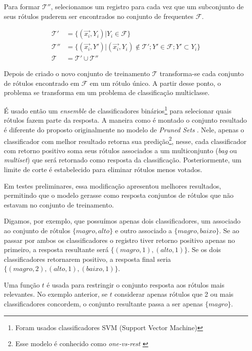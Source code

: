 \documentclass[runningheads,a4paper]{llncs}
\begin{document}
Para formar $\mathcal{T''}$, selecionamos um registro para cada vez que um subconjunto de seus rótulos puderem ser encontrados no conjunto de frequentes $\mathcal{F}$.

\begin{align*}
\mathcal{T'} &= \{(\vec{x_i}, Y_i) | Y_i \in \mathcal{F}\} \\
\mathcal{T''} &=  \{(\vec{x_i}, Y') | (\vec{x_i}, Y_i) \notin \mathcal{T'}; Y' \in \mathcal{F}; Y' \subset Y_i \} \\
\mathcal{T} &=  \mathcal{T'} \cup \mathcal{T''}
\end{align*}

Depois de criado o novo conjunto de treinamento $\mathcal{T}$ transforma-se cada conjunto de rótulos encontrado em $\mathcal{F}$ em um rótulo único. A partir desse ponto, o problema se transforma em um problema de classificação multiclasse.

É usado então um \textit{ensemble} de classificadores binários\footnote{Foram usados classificadores SVM (Support Vector Machine)} para selecionar quais rótulos fazem parte da resposta. A maneira como é montado o conjunto resultado é diferente do proposto originalmente no modelo de \textit{Pruned Sets} \cite{Read2008-bt}. Nele, apenas o classificador com melhor resultado retorna sua predição\footnote{Esse modelo é conhecido como \textit{one-vs-rest} \cite{Bishop2006-vm}}, nesse, cada classificador com retorno positivo soma seus rótulos associados a um multiconjunto (\textit{bag} ou \textit{multiset}) que será retornado como resposta da classificação. Posteriormente, um limite de corte é estabelecido para eliminar rótulos menos votados.

Em testes preliminares, essa modificação apresentou melhores resultados, permitindo que o modelo gerasse como resposta conjuntos de rótulos que não estavam no conjunto de treinamento.

Digamos, por exemplo, que possuímos apenas dois classificadores, um associado ao conjunto de rótulos $\{magro, alto\}$ e outro associado a $\{magro, baixo\}$. Se ao passar por ambos os classificadores o registro tiver retorno positivo apenas no primeiro, a resposta resultante será $\{(magro, 1), (alto, 1)\}$. Se os dois classificadores retornarem positivo, a resposta final seria $\{(magro, 2), (alto, 1), (baixo, 1)\}$.

Uma função $t$ é usada para restringir o conjunto resposta aos rótulos mais relevantes. No exemplo anterior, se $t$ considerar apenas rótulos que 2 ou mais classificadores concordem, o conjunto resultante passa a ser apenas $\{magro\}$.
\end{document}
